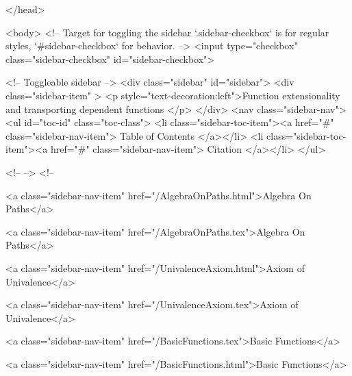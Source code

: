  
</head>




  <body>
    <!-- Target for toggling the sidebar `.sidebar-checkbox` is for regular
     styles, `#sidebar-checkbox` for behavior. -->
<input type="checkbox" class="sidebar-checkbox" id="sidebar-checkbox">

<!-- Toggleable sidebar -->
<div class="sidebar" id="sidebar">
  <div class="sidebar-item" >
    <p style="text-decoration:left">Function extensionality and transporting dependent functions </p>
  </div>
  <nav class="sidebar-nav">
    <ul id="toc-id" class="toc-class">
  <li class="sidebar-toc-item"><a href="#" class="sidebar-nav-item"> Table of Contents </a></li>
  <li class="sidebar-toc-item"><a href="#" class="sidebar-nav-item"> Citation </a></li>
</ul>


    <!--  -->
    <!-- 
      
    
      
    
      
    
      
        
      
    
      
        
          <a class="sidebar-nav-item" href="/AlgebraOnPaths.html">Algebra On Paths</a>
        
      
    
      
        
          <a class="sidebar-nav-item" href="/AlgebraOnPaths.tex">Algebra On Paths</a>
        
      
    
      
        
          <a class="sidebar-nav-item" href="/UnivalenceAxiom.html">Axiom of Univalence</a>
        
      
    
      
        
          <a class="sidebar-nav-item" href="/UnivalenceAxiom.tex">Axiom of Univalence</a>
        
      
    
      
        
          <a class="sidebar-nav-item" href="/BasicFunctions.tex">Basic Functions</a>
        
      
    
      
        
          <a class="sidebar-nav-item" href="/BasicFunctions.html">Basic Functions</a>
        
      
    
